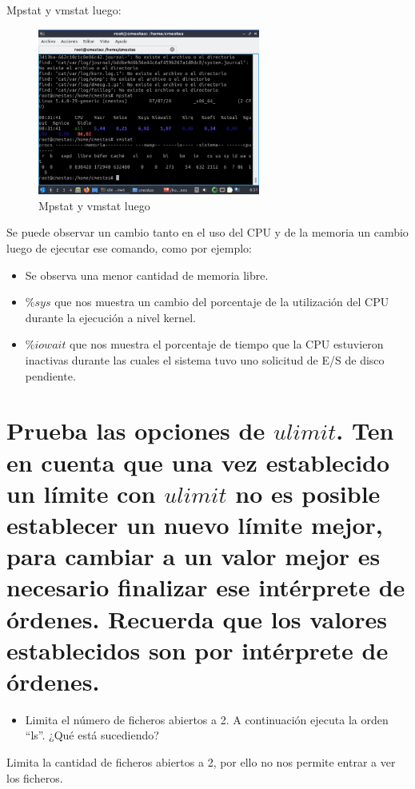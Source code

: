 \documentclass[12pt]{article}
\begin{document}
Mpstat y vmstat luego:

\begin{figure}[h]
    \centering
    \includegraphics[width=0.65\textwidth]{images/screenB06.jpg}
    \caption{Mpstat y vmstat luego}
\end{figure}

Se puede observar un cambio tanto en el uso del CPU y de la memoria un cambio luego de ejecutar ese comando, como por ejemplo:
\begin{itemize}
    \item Se observa una menor cantidad de memoria libre.
    \item $\%sys$ que nos muestra un cambio del porcentaje de la utilización del CPU durante la ejecución a nivel kernel.
    \item $\%iowait$ que nos muestra el porcentaje de tiempo que la CPU estuvieron inactivas durante las cuales el sistema tuvo uno solicitud de E/S de disco pendiente.
\end{itemize}

\clearpage
\newpage

\section{Prueba las opciones de $ulimit$. Ten en cuenta que una vez establecido un límite
con $ulimit$ no es posible establecer un nuevo límite mejor, para cambiar a un valor
mejor es necesario finalizar ese intérprete de órdenes. Recuerda que los valores
establecidos son por intérprete de órdenes.}

\begin{itemize}
    \item Limita el número de ficheros abiertos a 2. A continuación ejecuta la orden “ls”. ¿Qué está sucediendo?
\end{itemize}
Limita la cantidad de ficheros abiertos a 2, por ello no nos permite entrar a ver los ficheros.
\end{document}
